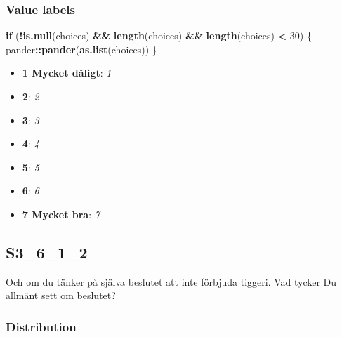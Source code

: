 \documentclass[]{book}
\newenvironment{Shaded}{\begin{snugshade}}{\end{snugshade}}
\newcommand{\KeywordTok}[1]{\textcolor[rgb]{0.13,0.29,0.53}{\textbf{#1}}}
\newcommand{\DecValTok}[1]{\textcolor[rgb]{0.00,0.00,0.81}{#1}}
\newcommand{\StringTok}[1]{\textcolor[rgb]{0.31,0.60,0.02}{#1}}
\newcommand{\ControlFlowTok}[1]{\textcolor[rgb]{0.13,0.29,0.53}{\textbf{#1}}}
\newcommand{\OperatorTok}[1]{\textcolor[rgb]{0.81,0.36,0.00}{\textbf{#1}}}
\newcommand{\NormalTok}[1]{#1}
\providecommand{\tightlist}{%
  \setlength{\itemsep}{0pt}\setlength{\parskip}{0pt}}
\begin{document}
\subsubsection{Value labels}\label{S3_6_1_1_labels}

\begin{Shaded}
\begin{Highlighting}[]
\ControlFlowTok{if}\NormalTok{ (}\OperatorTok{!}\KeywordTok{is.null}\NormalTok{(choices) }\OperatorTok{&&}\StringTok{ }\KeywordTok{length}\NormalTok{(choices) }\OperatorTok{&&}\StringTok{ }\KeywordTok{length}\NormalTok{(choices) }\OperatorTok{<}\StringTok{ }\DecValTok{30}\NormalTok{) \{}
\NormalTok{    pander}\OperatorTok{::}\KeywordTok{pander}\NormalTok{(}\KeywordTok{as.list}\NormalTok{(choices))}
\NormalTok{\}}
\end{Highlighting}
\end{Shaded}

\begin{itemize}
\tightlist
\item
  \textbf{1 Mycket dåligt}: \emph{1}
\item
  \textbf{2}: \emph{2}
\item
  \textbf{3}: \emph{3}
\item
  \textbf{4}: \emph{4}
\item
  \textbf{5}: \emph{5}
\item
  \textbf{6}: \emph{6}
\item
  \textbf{7 Mycket bra}: \emph{7}
\end{itemize}

\subsection{S3\_6\_1\_2}\label{S3_6_1_2}

Och om du tänker på själva beslutet att inte förbjuda tiggeri. Vad
tycker Du allmänt sett om beslutet?

\subsubsection{Distribution}\label{S3_6_1_2_distribution}
\end{document}
